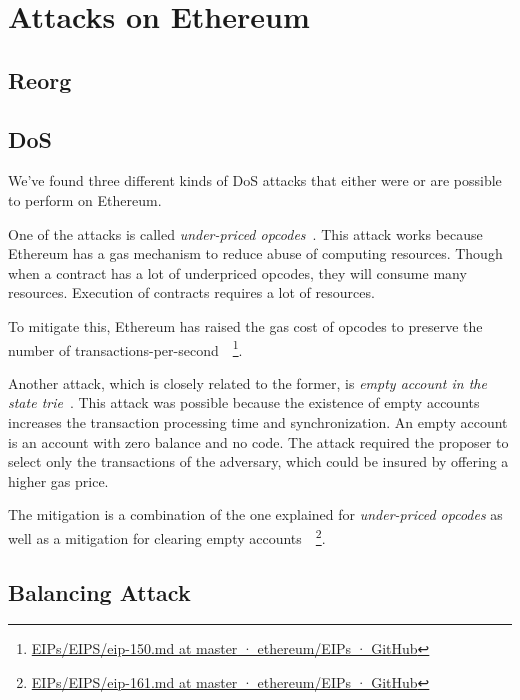 \section{Attacks on Ethereum}\label{sec:attacks-on-ethereum}
\subsection{Reorg}\label{subsec:reorg}

\subsection{DoS}\label{subsec:dos}
We've found three different kinds of DoS attacks that either were or are possible to perform on Ethereum.

One of the attacks is called \textit{under-priced opcodes}~\cite{10.1145/3391195,9815256}.
This attack works because Ethereum has a gas mechanism to reduce abuse of computing resources.
Though when a contract has a lot of underpriced opcodes, they will consume many resources.
Execution of contracts requires a lot of resources.

To mitigate this,
Ethereum has raised the gas cost of opcodes
to preserve the number of transactions-per-second~\cite{Opcode-mitigation}~\footnote{
\href{https://github.com/ethereum/EIPs/blob/master/EIPS/eip-150.md}{EIPs/EIPS/eip-150.md at master · ethereum/EIPs · GitHub}}.


Another attack,
which is closely related to the former, is \textit{empty account in the state trie}~\cite{10.1145/3391195,9815256}.
This attack was possible
because the existence of empty accounts increases the transaction processing time and synchronization.
An empty account is an account with zero balance and no code.
The attack required the proposer to select only the transactions of the adversary,
which could be insured by offering a higher gas price.

The mitigation is a combination of the one
explained for \textit{under-priced opcodes} as well as a mitigation
for clearing empty accounts~\cite{Opcode-mitigation,empty-account-mitigation,empty-account-eip-mitigation}~\footnote{
\href{https://github.com/ethereum/EIPs/blob/master/EIPS/eip-161.md}{EIPs/EIPS/eip-161.md at master · ethereum/EIPs · GitHub}}.








\subsection{Balancing Attack}\label{subsec:balancing-attack}

